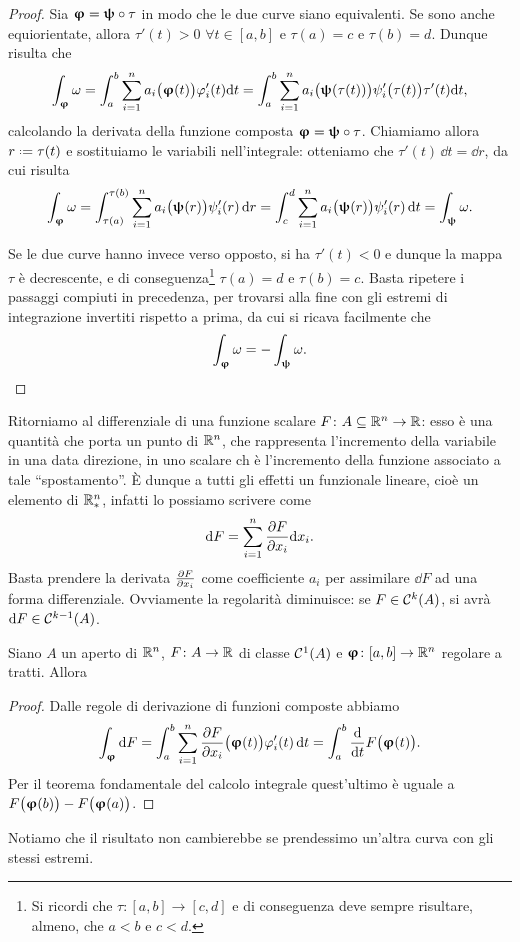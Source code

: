 \begin{proof}
	Sia $\bm{\upvarphi}=\bm{\uppsi}\circ\tau$ in modo che le due curve siano equivalenti.
	Se sono anche equiorientate, allora $\tau'(t)>0$ $\forall t\in[a,b]$ e $\tau(a)=c$ e $\tau(b)=d$.
	Dunque risulta che
	\begin{equation}
		\int_{\bm{\upvarphi}}\omega=\int_a^b\sum_{i=1}^na_i\big(\bm{\upvarphi}(t)\big)\varphi_i'(t)\textup{d} t
		=\int_a^b\sum_{i=1}^na_i\big(\bm{\uppsi}(\tau(t))\big)\psi_i'\big(\tau(t)\big)\tau'(t)\textup{d} t,
	\end{equation}
	calcolando la derivata della funzione composta $\bm{\upvarphi}=\bm{\uppsi}\circ\tau$.
	Chiamiamo allora $r\defeq\tau(t)$ e sostituiamo le variabili nell'integrale: otteniamo che $\tau'(t)\,\dd t=\dd r$, da cui risulta
	\begin{equation}
		\int_{\bm{\upvarphi}}\omega=\int_{\tau(a)}^{\tau(b)}\sum_{i=1}^na_i\big(\bm{\uppsi}(r)\big)\psi_i'(r)\,\textup{d} r
		=\int_c^d\sum_{i=1}^na_i\big(\bm{\uppsi}(r)\big)\psi_i'(r)\,\textup{d} t=\int_{\bm{\uppsi}}\omega.
	\end{equation}
	
	Se le due curve hanno invece verso opposto, si ha $\tau'(t)<0$ e dunque la mappa $\tau$ è decrescente, e di conseguenza\footnote{Si ricordi che $\tau\colon[a,b]\to[c,d]$ e di conseguenza deve sempre risultare, almeno, che $a<b$ e $c<d$.} $\tau(a)=d$ e $\tau(b)=c$. Basta ripetere i passaggi compiuti in precedenza, per trovarsi alla fine con gli estremi di integrazione invertiti rispetto a prima, da cui si ricava facilmente che
	\begin{equation*}
		\int_{\bm{\upvarphi}}\omega=-\int_{\bm{\uppsi}}\omega.
	\end{equation*}
\end{proof}
Ritorniamo al differenziale di una funzione scalare $F\colon A\subseteq\mathbb{R}^n\to\mathbb{R}$: esso è una quantità che porta un punto di $\mathbb{R}^n$, che rappresenta l'incremento della variabile in una data direzione, in uno scalare ch è l'incremento della funzione associato a tale ``spostamento''.
È dunque a tutti gli effetti un funzionale lineare, cioè un elemento di $\mathbb{R}^n_*$, infatti lo possiamo scrivere come
\begin{equation*}
	\textup{d} F=\sum_{i=1}^n\frac{\partial {F}}{\partial {x_i}}\textup{d} x_i.
\end{equation*}
Basta prendere la derivata $\frac{\partial {F}}{\partial {x_i}}$ come coefficiente $a_i$ per assimilare $\dd F$ ad una forma differenziale.
Ovviamente la regolarità diminuisce: se $F\in\mathcal{C}^{{k}}(A)$, si avrà $\textup{d} F\in\mathcal{C}^{{k-1}}(A)$.
\begin{teorema}
	 Siano $A$ un aperto di $\mathbb{R}^n$, $F\colon A\to\mathbb{R}$ di classe $\mathcal{C}^{{1}}(A)$ e $\bm{\upvarphi}\colon[a,b]\to\mathbb{R}^n$ regolare a tratti. Allora
\end{teorema}
\begin{proof}
	Dalle regole di derivazione di funzioni composte abbiamo
	\begin{equation}
		\int_{\bm{\upvarphi}}\textup{d} F=\int_a^b\sum_{i=1}^n\frac{\partial {F}}{\partial {x_i}}\big(\bm{\upvarphi}(t)\big)\varphi_i'(t)\,\textup{d} t=\int_a^b\frac{\textup{d} {}}{\textup{d} {t}}F\big(\bm{\upvarphi}(t)\big).
	\end{equation}
	Per il teorema fondamentale del calcolo integrale quest'ultimo è uguale a $F\big(\bm{\upvarphi}(b)\big)-F\big(\bm{\upvarphi}(a)\big)$.
\end{proof}
Notiamo che il risultato non cambierebbe se prendessimo un'altra curva con gli stessi estremi.

